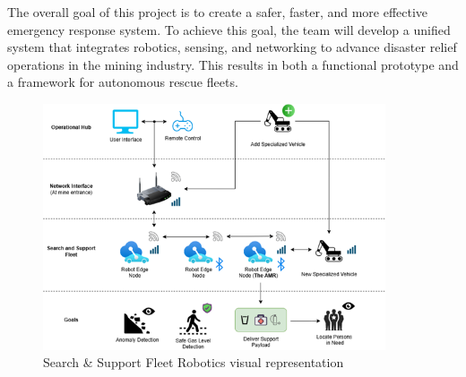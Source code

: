 The overall goal of this project is to create a safer, faster, and more effective emergency response system. To achieve this goal, the team will develop a unified system that integrates robotics, sensing, and networking to advance disaster relief operations in the mining industry. This results in both a functional prototype and a framework for autonomous rescue fleets.

\begin{figure}[H]
    \centering
    \includegraphics[width=0.9\textwidth]{images/project_visual_representation.png}
    \caption{Search \& Support Fleet Robotics visual representation}
    \label{fig:fleet_visual_representation}
\end{figure}

